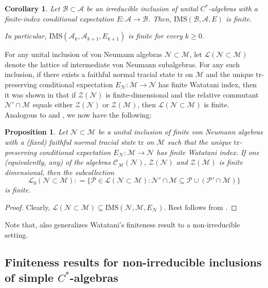 \documentclass{amsart}
\numberwithin{equation}{section}
\newcommand{\IMS}{\mathrm{IMS}}
\newcommand{\tr}{\mathrm{tr}}
\newcommand{\mcal}{\mathcal}
\newcommand{\1}{\mathbf{1}}
\newcommand{\mA}{\mathcal{A}}
\newcommand{\mB}{\mathcal{B}}
\newcommand{\mZ}{\mathcal{Z}}
\newcommand{\mM}{\mathcal{M}}
\newcommand{\mN}{\mathcal{N}}
\newtheorem{cor}[theorem]{Corollary}
\newtheorem{proposition}[theorem]{Proposition}
\begin{document}
\begin{cor}\label{IMS-finite}
Let $\mB \subset \mA$ be an irreducible inclusion of unital
$C^*$-algebras with a finite-index conditional expectation $E: \mA \to
\mB$. Then, $ \IMS(\mB, \mA, E)$ is finite.

In particular, $
\IMS(\mA_{k}, \mA_{k+1}, E_{k+1})$ is finite for every $k \geq 0$.
  \end{cor}


For any unital inclusion of von Neumann algebras $\mcal{N}\subset
\mcal{M}$, let $\mcal{L}(\mcal{N}\subset \mcal{M})$ denote the lattice
of intermediate von Neumann subalgebras.  For any such inclusion, if
there exists a faithful normal tracial state $\tr$ on $\mcal{M}$ and
the unique $\tr$-preserving conditional expectation $E_{\mcal{N}}:
\mcal{M} \to \mcal{N}$ has finite Watatani index, then it was shown in
\cite{BG} that if $\mZ(\mN)$ is finite-dimensional and the relative
commutant $\mN'\cap \mM$ equals either $ \mZ(\mN)$ or $\mZ(\mM)$, then
$\mcal{L}(\mN \subset \mM)$ is finite. Analogous to \cite[Theorem
  1.3]{KM} and , we now have the following:

\begin{proposition}\label{vNa-finiteness-general}
Let $\mcal{N}\subset \mcal{M}$ be a unital inclusion of finite von
Neumann algebras with a (fixed) faithful normal tracial state $\tr$ on
$\mcal{M}$ such that the unique $\tr$-preserving conditional
expectation $E_{\mcal{N}}: \mcal{M} \to \mcal{N}$ has finite Watatani
index. If one (equivalently, any) of the algebras
$\mcal{C}_\mcal{M}(\mcal{N})$, $\mcal{Z}(\mcal{N})$ and
$\mcal{Z}(\mcal{M})$ is finite dimensional, then the subcollection
\[
\mathcal{L}_0(\mN \subset \mM): = \{\mcal{P} \in
\mcal{L}(\mcal{N}\subset \mcal{M}) : \mcal{N}{'}\cap \mcal{M}
\subseteq \mcal{P}\cup (\mcal{P}{'}\cap \mcal{M}) \}
\]
is finite.
\end{proposition}
\begin{proof}
Clearly, $\mcal{L}(\mcal{N}\subset \mcal{M}) \subseteq
\IMS(\mcal{N},\mcal{M},E_{\mcal{N}})$. Rest follows from
.
\end{proof}

Note that,  also generalizes Watatani's
finiteness result \cite[Theorem 2.2]{Wat2}  to a non-irreducible setting.




\subsection{Finiteness results for non-irreducible inclusions of simple $C^*$-algebras}
\end{document}
